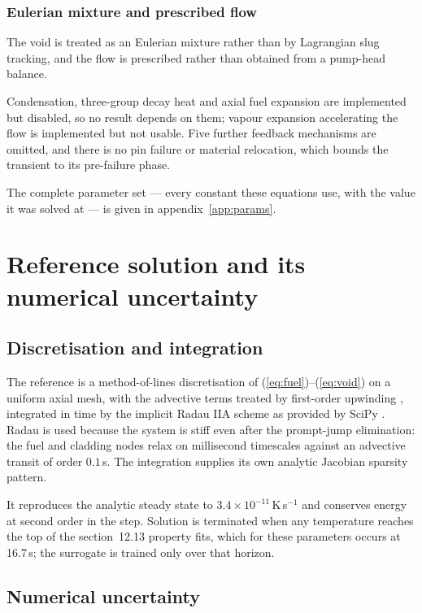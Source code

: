 \documentclass[11pt,a4paper]{article}
\begin{document}
\subsubsection{Eulerian mixture and prescribed flow}
The void is treated as an Eulerian mixture rather than by Lagrangian slug tracking, and the
flow is prescribed rather than obtained from a pump-head balance.

Condensation, three-group decay heat and axial fuel expansion are implemented but disabled,
so no result depends on them; vapour expansion accelerating the flow is implemented but not
usable. Five further feedback mechanisms are omitted, and there is no pin failure or
material relocation, which bounds the transient to its pre-failure phase.

The complete parameter set --- every constant these equations use, with the value it was
solved at --- is given in appendix~\ref{app:params}.

\section{Reference solution and its numerical uncertainty}\label{sec:reference}

\subsection{Discretisation and integration}

The reference is a method-of-lines discretisation of
(\ref{eq:fuel})--(\ref{eq:void}) on a uniform axial mesh, with the advective terms treated
by first-order upwinding \cite{leveque}, integrated in time by the implicit Radau IIA
scheme \cite{hairer} as provided by SciPy \cite{scipy}. Radau is used because the system is
stiff even after the prompt-jump elimination: the fuel and cladding nodes relax on
millisecond timescales against an advective transit of order $0.1$\,s. The integration
supplies its own analytic Jacobian sparsity pattern.

It reproduces the analytic steady state to $3.4\times10^{-11}$\,K\,s$^{-1}$ and conserves
energy at second order in the step. Solution is terminated when any temperature reaches the
top of the section~12.13 property fits, which for these parameters occurs at 16.7\,s; the
surrogate is trained only over that horizon.

\subsection{Numerical uncertainty}
\end{document}
